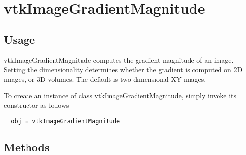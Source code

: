 \section{vtkImageGradientMagnitude}

\subsection{Usage}

 vtkImageGradientMagnitude computes the gradient magnitude of an image.
 Setting the dimensionality determines whether the gradient is computed on
 2D images, or 3D volumes.  The default is two dimensional XY images.

To create an instance of class vtkImageGradientMagnitude, simply
invoke its constructor as follows
\begin{verbatim}
  obj = vtkImageGradientMagnitude
\end{verbatim}
\subsection{Methods}

